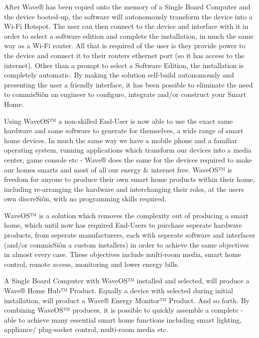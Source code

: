 \documentclass[letterpaper,10pt,english]{sphinxmanual}
\begin{document}
After Wave® has been copied onto the memory of a Single Board Computer and the device booted-up, the software will autonomously transform the device into a Wi-Fi Hotspot. The user can then connect to the device and interface with it in order to select a software edition and complete the installation, in much the same way as a Wi-Fi router. All that is required of the user is they provide power to the device and connect it to their routers ethernet port (so it has access to the internet). Other than a prompt to select a Software Edition, the installation is completely automatic. By making the solution self-build autonomously and presenting the user a friendly interface, it has been possible to eliminate the need to commisSiôn an engineer to configure, integrate and/or construct your Smart Home.

Using WaveOS™ a non-skilled End-User is now able to use the exact same hardware and same software to generate for themselves, a wide range of smart home devices. In much the same way we have a mobile phone and a familiar operating system, running applications which transform our devices into a media center, game console etc - Wave® does the same for the devices required to make our homes smarts and most of all our energy \& internet free. WaveOS™ is freedom for anyone to produce their own smart home products within their home, including re-arranging the hardware and interchanging their roles, at the users own discreSiôn, with no programming skills required.

WaveOS™ is a solution which removes the complexity out of producing a smart home, which until now has required End-Users to purchase seperate hardware products, from seperate manufacturers, each with seperate software and interfaces (and/or commisSiôn a custom installers) in order to achieve the same objectives in almost every case. These objectives include multi-room media, smart home control, remote access, monitoring and lower energy bills.

A Single Board Computer with WaveOS™ installed and  selected, will produce a Wave® Home Hub™ Product. Equally a device with  selected during initial installation, will product a Wave® Energy Monitor™ Product. And so forth. By combining  WaveOS™ produces, it is possible to quickly assemble a complete  - able to achieve many essential smart home functions including smart lighting, appliance/ plug-socket control, multi-room media etc.
\end{document}
